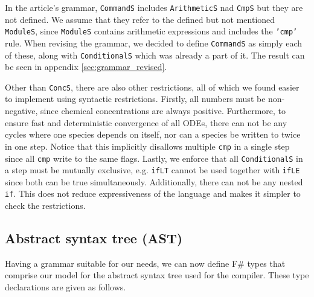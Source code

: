 In the article's grammar, \texttt{CommandS} includes \texttt{ArithmeticS} nad \texttt{CmpS} but they are not defined. We assume that they refer to the defined but not mentioned \texttt{ModuleS}, since \texttt{ModuleS} contains arithmetic expressions and includes the \texttt{'cmp'} rule. When revising the grammar, we decided to define \texttt{CommandS} as simply each of these, along with \texttt{ConditionalS} which was already a part of it. The result can be seen in appendix \ref{sec:grammar_revised}. 

Other than \texttt{ConcS}, there are also other restrictions, all of which we found easier to implement using syntactic restrictions. Firstly, all numbers must be non-negative, since chemical concentrations are always positive. Furthermore, to ensure fast and deterministic convergence of all ODEs, there can not be any cycles where one species depends on itself, nor can a species be written to twice in one step. Notice that this implicitly disallows multiple \texttt{cmp} in a single step since all \texttt{cmp} write to the same flags. Lastly, we enforce that all \texttt{ConditionalS} in a step must be mutually exclusive, e.g. \texttt{ifLT} cannot be used together with \texttt{ifLE} since both can be true simultaneously. Additionally, there can not be any nested \texttt{if}. This does not reduce expressiveness of the language and makes it simpler to check the restrictions.


\subsection{Abstract syntax tree (AST)}
Having a grammar suitable for our needs, we can now define F\# types that comprise our model for the abstract syntax tree used for the compiler. These type declarations are given as follows. 

